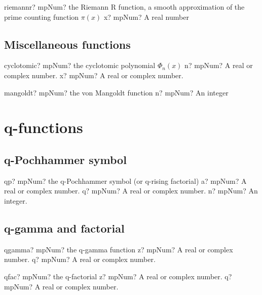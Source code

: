 \documentclass[12pt,a4paper,openany]{book}
\begin{document}
\begin{mpFunctionsExtract}
\mpFunctionOne
{riemannr? mpNum? the Riemann R function, a smooth approximation of the prime counting function $\pi(x)$}
{x? mpNum? A real number}
\end{mpFunctionsExtract}

\section{Miscellaneous functions}

\begin{mpFunctionsExtract}
\mpFunctionTwo
{cyclotomic? mpNum? the cyclotomic polynomial $\Phi_n(x)$}
{n? mpNum? A real or complex number.}
{x? mpNum? A real or complex number.}
\end{mpFunctionsExtract}

\begin{mpFunctionsExtract}
\mpFunctionOne
{mangoldt? mpNum? the von Mangoldt function}
{n? mpNum? An integer}
\end{mpFunctionsExtract}

\chapter{q-functions}

\section{q-Pochhammer symbol}

\begin{mpFunctionsExtract}
\mpFunctionThree
{qp? mpNum? the q-Pochhammer symbol (or q-rising factorial)}
{a? mpNum? A real or complex number.}
{q? mpNum? A real or complex number.}
{n? mpNum? An integer.}
\end{mpFunctionsExtract}

\section{q-gamma and factorial}

\begin{mpFunctionsExtract}
\mpFunctionTwo
{qgamma? mpNum? the q-gamma function}
{z? mpNum? A real or complex number.}
{q? mpNum? A real or complex number.}
\end{mpFunctionsExtract}

\begin{mpFunctionsExtract}
\mpFunctionTwo
{qfac? mpNum? the  q-factorial}
{z? mpNum? A real or complex number.}
{q? mpNum? A real or complex number.}
\end{mpFunctionsExtract}
\end{document}
